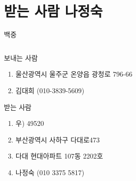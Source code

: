 \documentclass[aspectratio=1610,12pt,xcolor=pdftex,dvipsnames,table,handout]{beamer}
\begin{document}
		\section{받는 사람 나정숙}
		\begin{frame}[c,plain]{백중}

		\begin{columns}[t]
		\begin{column}{0.6\textwidth}

			\begin{block} {보내는 사람}
			\begin{enumerate}
			\item [] 울산광역시 울주군 온양읍 광청로 796-66
			\item [] 김대희 (010-3839-5609)
			\end{enumerate}
			\end{block}


			\begin{block} {받는 사람}
			\begin{enumerate}
			\item [] 우) 49520
			\item [] 부산광역시 사하구 다대로473 
			\item [] 다대 현대아파트 107동 2202호
			\item [] 나정숙 (010 3375 5817)
			\end{enumerate}
			\end{block}

		\end{column}

		\end{columns}
		\null
		\end{frame}



\end{document}
